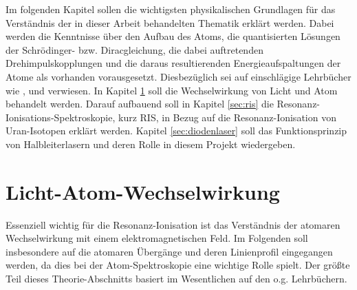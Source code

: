 Im folgenden Kapitel sollen die wichtigsten physikalischen Grundlagen für das
Verständnis der in dieser Arbeit behandelten Thematik erklärt werden. Dabei
werden die Kenntnisse über den Aufbau des Atoms, die quantisierten Lösungen der
Schrödinger- bzw. Diracgleichung, die dabei auftretenden Drehimpulskopplungen
und die daraus resultierenden Energieaufspaltungen der Atome als vorhanden
vorausgesetzt. Diesbezüglich sei auf einschlägige Lehrbücher wie
\cite{demtroeder:ex3}, \cite{demtroeder:laserspektroskopie} und \cite{saleh:grundlagen_der_photonik}
verwiesen. In Kapitel \ref{sec:licht-atom-wechselwirkung} soll die
Wechselwirkung von Licht und Atom behandelt werden. Darauf aufbauend soll
in Kapitel \ref{sec:ris} die Resonanz-Ionisations-Spektroskopie,
kurz RIS, in Bezug auf die Resonanz-Ionisation von Uran-Isotopen erklärt
werden. Kapitel \ref{sec:diodenlaser} soll das Funktionsprinzip von
Halbleiterlasern und deren Rolle in diesem Projekt wiedergeben.

\section{Licht-Atom-Wechselwirkung}\label{sec:licht-atom-wechselwirkung}
Essenziell wichtig für die Resonanz-Ionisation ist das Verständnis der atomaren
Wechselwirkung mit einem elektromagnetischen Feld. Im Folgenden soll insbesondere auf die
atomaren Übergänge und deren Linienprofil eingegangen werden, da dies bei der
Atom-Spektroskopie eine wichtige Rolle spielt. Der größte Teil dieses
Theorie-Abschnitts basiert im Wesentlichen auf den o.g. Lehrbüchern.



